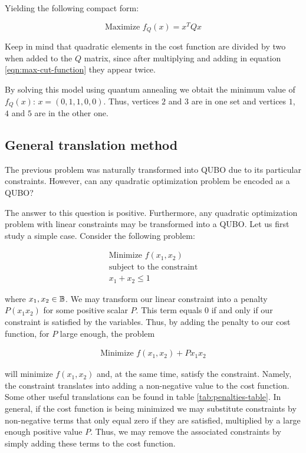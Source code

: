 Yielding the following compact form:

\begin{equation}
\label{eqn:max-cut-function}
	\text{Maximize  } f_Q(x) = x^T Q x
\end{equation}

Keep in mind that quadratic elements in the cost function are divided by two when added to the $Q$ matrix, since after multiplying and adding in equation \ref{eqn:max-cut-function} they appear twice.

By solving this model using quantum annealing we obtait the minimum value of $f_Q(x)$: $x = (0, 1, 1, 0, 0)$. Thus, vertices $2$ and $3$ are in one set and vertices $1$, $4$ and $5$ are in the other one.


\subsection{General translation method}

The previous problem was naturally transformed into QUBO due to its particular constraints. However, can any quadratic optimization problem be encoded as a QUBO?

The answer to this question is positive. Furthermore, any quadratic optimization problem with linear constraints may be transformed into a QUBO. Let us first study a simple case. Consider the following problem:

\begin{gather*}
	\text{Minimize } f(x_1, x_2) \\
	\text{subject to the constraint} \\
	x_1 + x_2 \leq 1
\end{gather*}

where $x_1, x_2 \in \mathbb{B}$. We may transform our linear constraint into a penalty $P(x_1x_2)$ for some positive scalar $P$. This term equals $0$ if and only if our constraint is satisfied by the variables. Thus, by adding the penalty to our cost function, for $P$ large enough, the problem

\begin{gather*}
	\text{Minimize } f(x_1, x_2) + Px_1x_2
\end{gather*}

will minimize $f(x_1, x_2)$ and, at the same time, satisfy the constraint. Namely, the constraint translates into adding a non-negative value to the cost function. Some other useful translations can be found in table \ref{tab:penalties-table}. In general, if the cost function is being minimized we may substitute constraints by non-negative terms that only equal zero if they are satisfied, multiplied by a large enough positive value $P$. Thus, we may remove the associated constraints by simply adding these terms to the cost function.

